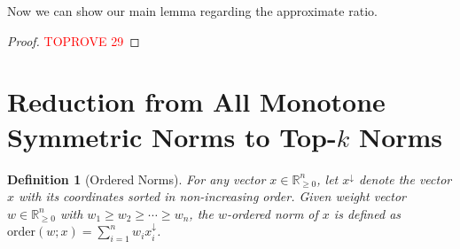 \documentclass[11pt]{article}
\newcommand{\R}{\mathbb{R}}
\newtheorem{definition}[theorem]{Definition}
\newcommand{\order}{\mathrm{order}}
\begin{document}
\begin{CJK*}{UTF8}{gbsn}
Now we can show our main lemma regarding the approximate ratio.

\begin{proof}\textcolor{red}{TOPROVE 29}\end{proof}















































































%
 






\appendix

\section{Reduction from All Monotone Symmetric Norms to Top-$k$ Norms}
\label{sec:all-norm}



\begin{definition}[Ordered Norms]
    For any vector $x\in \mathbb{R}_{\geq 0}^n$, let $x^\downarrow$ denote the vector $x$ with its coordinates sorted in non-increasing order. Given weight vector $w \in \R_{\geq 0}^n$ with $w_1 \geq w_2 \geq \cdots \geq w_n$, the $w$-ordered norm of $x$ is defined as $\order(w;x)=\sum_{i=1}^n w_i x_i^\downarrow$.
\end{definition}



\end{CJK*}
\end{document}
